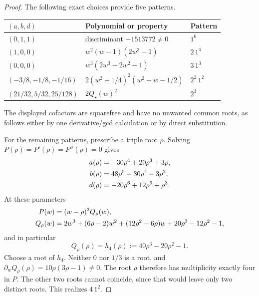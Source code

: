 \documentclass[11pt,a4paper]{article}
\theoremstyle{definition}
\begin{document}
\begin{proof}
The following exact choices provide five patterns.
\begin{center}
\renewcommand{\arraystretch}{1.2}
\begin{tabular}{@{}lll@{}}
\toprule
$(a,b,d)$ & Polynomial or property & Pattern\\
\midrule
$(0,1,1)$ & discriminant $-1513772\ne0$ & $1^6$\\
$(1,0,0)$ & $w^2(w-1)(2w^3-1)$ & $2\,1^4$\\
$(0,0,0)$ & $w^3(2w^3-2w^2-1)$ & $3\,1^3$\\
$(-3/8,-1/8,-1/16)$ & $2(w^2+1/4)^2(w^2-w-1/2)$ & $2^2\,1^2$\\
$(21/32,5/32,25/128)$ & $2Q_\star(w)^2$ & $2^3$\\
\bottomrule
\end{tabular}
\end{center}
The displayed cofactors are squarefree and have no unwanted common roots, as
follows either by one derivative/gcd calculation or by direct substitution.

For the remaining patterns, prescribe a triple root $\rho$. Solving
$P(\rho)=P'(\rho)=P''(\rho)=0$ gives
\begin{align}
a(\rho)&=-30\rho^4+20\rho^3+3\rho,\notag\\
b(\rho)&=48\rho^5-30\rho^4-3\rho^2,\label{f6:kf:eq:triple}\\
d(\rho)&=-20\rho^6+12\rho^5+\rho^3.\notag
\end{align}
At these parameters
\begin{align}
P(w)&=(w-\rho)^3Q_\rho(w),\notag\\
Q_\rho(w)&=2w^3+(6\rho-2)w^2+(12\rho^2-6\rho)w+20\rho^3-12\rho^2-1,
\label{f6:kf:eq:triplefactor}
\end{align}
and in particular
\begin{equation}\label{f6:kf:eq:H4}
Q_\rho(\rho)=h_4(\rho):=40\rho^3-20\rho^2-1 .
\end{equation}
Choose a root of $h_4$. Neither $0$ nor $1/3$ is a root, and
$\partial_wQ_\rho(\rho)=10\rho(3\rho-1)\ne0$. The root $\rho$ therefore has
multiplicity exactly four in $P$. The other two roots cannot coincide, since
that would leave only two distinct roots. This realizes $4\,1^2$.


\end{proof}
\end{document}
